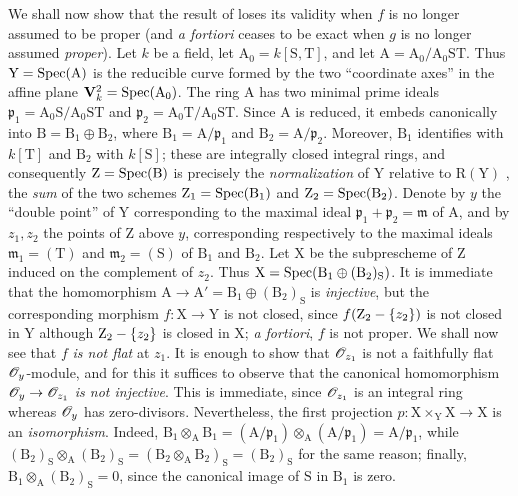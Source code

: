 \begin{env}[11.7.2]
\label{IV.11.7.2}
We shall now show that the result of  loses its validity when $f$ is no longer assumed to be proper (and \emph{a fortiori}  ceases to be exact when $g$ is no longer assumed \emph{proper}).
Let $k$ be a field, let $\mathrm{A}_0=k[\mathrm{S},\mathrm{T}]$, and let $\mathrm{A}=\mathrm{A}_0/\mathrm{A}_0\mathrm{S}\mathrm{T}$. Thus $\mathrm{Y}=\operatorname{Spec}(\mathrm{A})$ is the reducible curve formed by the two ``coordinate axes'' in the affine plane $\mathbf{V}_k^2=\operatorname{Spec}(\mathrm{A}_0)$.
The ring $\mathrm{A}$ has two minimal prime ideals $\mathfrak{p}_1=\mathrm{A}_0\mathrm{S}/\mathrm{A}_0\mathrm{S}\mathrm{T}$ and $\mathfrak{p}_2=\mathrm{A}_0\mathrm{T}/\mathrm{A}_0\mathrm{S}\mathrm{T}$. Since $\mathrm{A}$ is reduced, it embeds canonically into $\mathrm{B}=\mathrm{B}_1\oplus\mathrm{B}_2$, where $\mathrm{B}_1=\mathrm{A}/\mathfrak{p}_1$ and $\mathrm{B}_2=\mathrm{A}/\mathfrak{p}_2$. Moreover, $\mathrm{B}_1$ identifies with $k[\mathrm{T}]$ and $\mathrm{B}_2$ with $k[\mathrm{S}]$; these are integrally closed integral rings, and consequently $\mathrm{Z}=\operatorname{Spec}(\mathrm{B})$ is precisely the \emph{normalization} of $\mathrm{Y}$ relative to $\mathrm{R}(\mathrm{Y})$ , the \emph{sum} of the two schemes $\mathrm{Z}_1=\operatorname{Spec}(\mathrm{B}_1)$ and $\mathrm{Z}_2=\operatorname{Spec}(\mathrm{B}_2)$.
Denote by $y$ the ``double point'' of $\mathrm{Y}$ corresponding to the maximal ideal $\mathfrak{p}_1+\mathfrak{p}_2=\mathfrak{m}$ of $\mathrm{A}$, and by $z_1,z_2$ the points of $\mathrm{Z}$ above $y$, corresponding respectively to the maximal ideals $\mathfrak{m}_1=(\mathrm{T})$ and $\mathfrak{m}_2=(\mathrm{S})$ of $\mathrm{B}_1$ and $\mathrm{B}_2$.
Let $\mathrm{X}$ be the subprescheme of $\mathrm{Z}$ induced on the complement of $z_2$. Thus $\mathrm{X}=\operatorname{Spec}(\mathrm{B}_1\oplus(\mathrm{B}_2)_\mathrm{S})$. It is immediate that the homomorphism $\mathrm{A}\to\mathrm{A}'=\mathrm{B}_1\oplus(\mathrm{B}_2)_\mathrm{S}$ is \emph{injective}, but the corresponding morphism $f:\mathrm{X}\to\mathrm{Y}$ is not closed, since $f(\mathrm{Z}_2-\{z_2\})$ is not closed in $\mathrm{Y}$ although $\mathrm{Z}_2-\{z_2\}$ is closed in $\mathrm{X}$; \emph{a fortiori}, $f$ is not proper.
We shall now see that $f$ \emph{is not flat} at $z_1$. It is enough to show  that $\mathscr{O}_{z_1}$ is not a faithfully flat $\mathscr{O}_y$-module, and for this it suffices to observe that the canonical homomorphism $\mathscr{O}_y\to\mathscr{O}_{z_1}$ \emph{is not injective}. This is immediate, since $\mathscr{O}_{z_1}$ is an integral ring whereas $\mathscr{O}_y$ has zero-divisors.
Nevertheless, the first projection $p:\mathrm{X}\times_\mathrm{Y}\mathrm{X}\to\mathrm{X}$ is an \emph{isomorphism}. Indeed, $\mathrm{B}_1\otimes_\mathrm{A}\mathrm{B}_1
=(\mathrm{A}/\mathfrak{p}_1)\otimes_\mathrm{A}(\mathrm{A}/\mathfrak{p}_1)
=\mathrm{A}/\mathfrak{p}_1$,
while $(\mathrm{B}_2)_\mathrm{S}\otimes_\mathrm{A}(\mathrm{B}_2)_\mathrm{S}=(\mathrm{B}_2\otimes_\mathrm{A}\mathrm{B}_2)_\mathrm{S}=(\mathrm{B}_2)_\mathrm{S}$ for the same reason; finally, $\mathrm{B}_1\otimes_\mathrm{A}(\mathrm{B}_2)_\mathrm{S}=0$, since the canonical image of $\mathrm{S}$ in $\mathrm{B}_1$ is zero.
\end{env}

